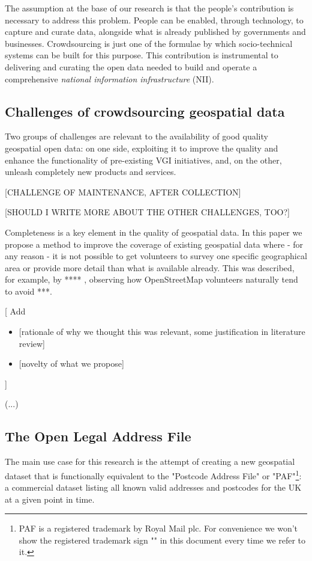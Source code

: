     The assumption at the base of our research is that the people's contribution is necessary to address this problem. People can be enabled, through technology, to capture and curate data, alongside what is already published by governments and businesses. Crowdsourcing is just one of the formulae by which socio-technical systems can be built for this purpose. This contribution is instrumental to delivering and curating the open data needed to build and operate a comprehensive {\it national information infrastructure} (NII).

\subsection{Challenges of crowdsourcing geospatial data}

    Two groups of challenges are relevant to the availability of good quality geospatial open data: on one side, exploiting it to improve the quality and enhance the functionality of pre-existing VGI initiatives, and, on the other, unleash completely new products and services.
    
    [CHALLENGE OF MAINTENANCE, AFTER COLLECTION]
    
    [SHOULD I WRITE MORE ABOUT THE OTHER CHALLENGES, TOO?]
    
    Completeness is a key element in the quality of geospatial data. In this paper we propose a method to improve the coverage of existing geospatial data where - for any reason - it is not possible to get volunteers to survey one specific geographical area or provide more detail than what is available already. This was described, for example, by **** , observing how OpenStreetMap volunteers naturally tend to avoid ***.
    
    {[}
    Add
    \begin{itemize}
    	\item {[}rationale of why we thought this was relevant, some justification in literature review{]}
    	\item {[}novelty of what we propose{]}
    \end{itemize}
    {]}
    
    {(}...{)}

\subsection{The Open Legal Address File}

    The main use case for this research is the attempt of creating a new geospatial dataset that is functionally equivalent to the "Postcode Address File" or "PAF"\footnote{PAF is a registered trademark by Royal Mail plc. For convenience we won't show the registered trademark sign "\textregistered" in this document every time we refer to it.}: a commercial dataset listing all known valid addresses and postcodes for the UK at a given point in time. 
    

